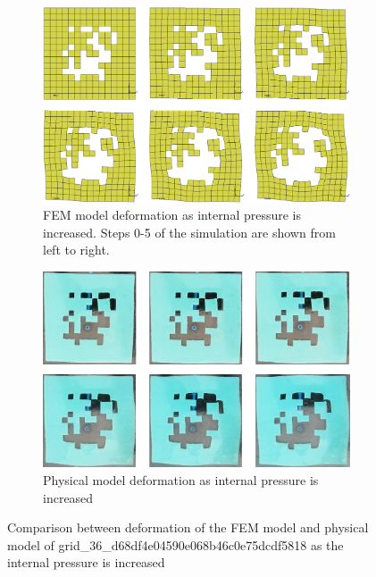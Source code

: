 \begin{figure}[H]
	\centering
	\begin{subfigure}[c]{\textwidth}
		\centering
		\includegraphics[width=\textwidth]{unit1deffem.png}
		\caption{FEM model deformation as internal pressure is increased. Steps 0-5 of the simulation are shown from left to right.}
	\end{subfigure}
	\hfill
	\begin{subfigure}[c]{\textwidth}
		\centering
		\includegraphics[width=\textwidth]{unit1defmod.png}
		\caption{Physical model deformation as internal pressure is increased}
	\end{subfigure}
	\caption[Comparison between FEM and physical models of unit 1]{Comparison between deformation of the FEM model and physical model of grid\_36\_d68df4e04590e068b46c0e75dcdf5818 as the internal pressure is increased}
	\label{fig:unit1def}
\end{figure}

